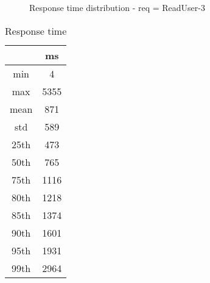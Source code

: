 \begin{minipage}{0.75\linewidth}
\begin{figure}[h]
\begin{adjustbox}{max width=1.0\linewidth, keepaspectratio}
  \end{adjustbox}
  \caption{Response time distribution - req = ReadUser-3}
\end{figure}
\end{minipage}\hfill\begin{minipage}{0.18\linewidth}
\begin{table}[h]
\begin{tabular}{|cc|}
\hline
\textbf{} & \textbf{ms}\\ \hline
 \Xhline{0.005\arrayrulewidth}
min & 4\\
 \Xhline{0.005\arrayrulewidth}
max & 5355\\
 \Xhline{0.005\arrayrulewidth}
mean & 871\\
 \Xhline{0.005\arrayrulewidth}
std & 589\\
\hline
\hline
 \Xhline{0.005\arrayrulewidth}
25th & 473\\
 \Xhline{0.005\arrayrulewidth}
50th & 765\\
 \Xhline{0.005\arrayrulewidth}
75th & 1116\\
 \Xhline{0.005\arrayrulewidth}
80th & 1218\\
 \Xhline{0.005\arrayrulewidth}
85th & 1374\\
 \Xhline{0.005\arrayrulewidth}
90th & 1601\\
 \Xhline{0.005\arrayrulewidth}
95th & 1931\\
 \Xhline{0.005\arrayrulewidth}
99th & 2964\\
\hline
\end{tabular}
\caption{Response time}
\end{table}
\end{minipage}\hfill